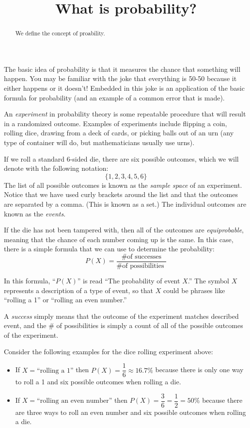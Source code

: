 \documentclass{ximera}
\title{What is probability?}
\begin{document}
\begin{abstract}
We define the concept of proability.
\end{abstract}
\maketitle

The basic idea of probability is that it measures the chance that something will happen. You may be familiar with the joke that everything is 50-50 because it either happens or it doesn't! Embedded in this joke is an application of the basic formula for probability (and an example of a common error that is made).

An \emph{experiment} in probability theory is some repeatable procedure that will result in a randomized outcome. Examples of experiments include flipping a coin, rolling dice, drawing from a deck of cards, or picking balls out of an urn (any type of container will do, but mathematicians usually use urns).

If we roll a standard 6-sided die, there are six possible outcomes, which we will denote with the following notation:
\[ \{ 1, 2, 3, 4, 5, 6 \} \]
The list of all possible outcomes is known as the \emph{sample space} of an experiment. Notice that we have used curly brackets around the list and that the outcomes are separated by a comma. (This is known as a set.) The individual outcomes are known as the \emph{events}.

If the die has not been tampered with, then all of the outcomes are \emph{equiprobable}, meaning that the chance of each number coming up is the same. In this case, there is a simple formula that we can use to determine the probability:
\[ P(X) = \dfrac{ \text{ \# of successes }}{ \text{\# of possibilities } } \]

In this formula, ``$P(X)$'' is read ``The probability of event $X$.'' The symbol $X$ represents a description of a type of event, so that $X$ could be phrases like ``rolling a 1'' or ``rolling an even number.''

A \emph{success} simply means that the outcome of the experiment matches described event, and the \# of possibilities is simply a count of all of the possible outcomes of the experiment.

Consider the following examples for the dice rolling experiment above:
\begin{itemize}
  \item If $X = \text{``rolling a 1''}$ then $P(X) = \dfrac{1}{6} \approx 16.7\%$ because there is only one way to roll a 1 and six possible outcomes when rolling a die.
  \item If $X = \text{``rolling an even number''}$ then $P(X) = \dfrac{3}{6} = \dfrac{1}{2} = 50\%$ because there are three ways to roll an even number and six possible outcomes when rolling a die.
\end{itemize}
\end{document}

